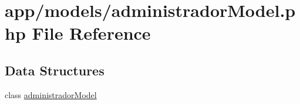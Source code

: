 \hypertarget{administrador_model_8php}{}\section{app/models/administrador\+Model.php File Reference}
\label{administrador_model_8php}
\subsection*{Data Structures}
\begin{DoxyCompactItemize}
\item 
class \hyperlink{classadministrador_model}{administrador\+Model}
\end{DoxyCompactItemize}
